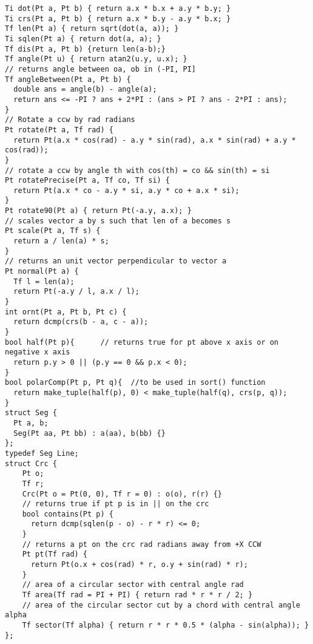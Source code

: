 \documentclass[FSZ,a4paper,onesided]{article}
\begin{document}
\begin{multicols*}{\COLS}
\begin{lstlisting}
Ti dot(Pt a, Pt b) { return a.x * b.x + a.y * b.y; }
Ti crs(Pt a, Pt b) { return a.x * b.y - a.y * b.x; }
Tf len(Pt a) { return sqrt(dot(a, a)); }
Ti sqlen(Pt a) { return dot(a, a); }
Tf dis(Pt a, Pt b) {return len(a-b);}
Tf angle(Pt u) { return atan2(u.y, u.x); }
// returns angle between oa, ob in (-PI, PI]
Tf angleBetween(Pt a, Pt b) {
  double ans = angle(b) - angle(a);
  return ans <= -PI ? ans + 2*PI : (ans > PI ? ans - 2*PI : ans);
}
// Rotate a ccw by rad radians
Pt rotate(Pt a, Tf rad) {
  return Pt(a.x * cos(rad) - a.y * sin(rad), a.x * sin(rad) + a.y * cos(rad));
}
// rotate a ccw by angle th with cos(th) = co && sin(th) = si
Pt rotatePrecise(Pt a, Tf co, Tf si) {
  return Pt(a.x * co - a.y * si, a.y * co + a.x * si);
}
Pt rotate90(Pt a) { return Pt(-a.y, a.x); }
// scales vector a by s such that len of a becomes s
Pt scale(Pt a, Tf s) {
  return a / len(a) * s;
}
// returns an unit vector perpendicular to vector a
Pt normal(Pt a) {
  Tf l = len(a);
  return Pt(-a.y / l, a.x / l);
}
int ornt(Pt a, Pt b, Pt c) {
  return dcmp(crs(b - a, c - a));
}
bool half(Pt p){      // returns true for pt above x axis or on negative x axis
  return p.y > 0 || (p.y == 0 && p.x < 0);
}
bool polarComp(Pt p, Pt q){  //to be used in sort() function
  return make_tuple(half(p), 0) < make_tuple(half(q), crs(p, q));
}
struct Seg {
  Pt a, b;
  Seg(Pt aa, Pt bb) : a(aa), b(bb) {}
};
typedef Seg Line;
struct Crc {
    Pt o;
    Tf r;
    Crc(Pt o = Pt(0, 0), Tf r = 0) : o(o), r(r) {}
    // returns true if pt p is in || on the crc
    bool contains(Pt p) {
      return dcmp(sqlen(p - o) - r * r) <= 0;
    }
    // returns a pt on the crc rad radians away from +X CCW
    Pt pt(Tf rad) {
      return Pt(o.x + cos(rad) * r, o.y + sin(rad) * r);
    }
    // area of a circular sector with central angle rad
    Tf area(Tf rad = PI + PI) { return rad * r * r / 2; }
    // area of the circular sector cut by a chord with central angle alpha
    Tf sector(Tf alpha) { return r * r * 0.5 * (alpha - sin(alpha)); }
};
\end{lstlisting}

\end{multicols*}
\end{document}
